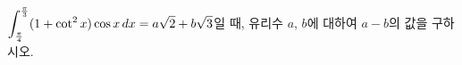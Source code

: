 \hspace*{2mm}\begin{minipage}[t]{\dimexpr\linewidth-2mm\relax}\vspace{0pt}
$\displaystyle\int_{\frac{\pi}{4}}^{\frac{\pi}{3}}(1+\cot^2 x)\cos x\mkern3mu dx=a\sqrt{2}+b\sqrt{3}$일 때, 유리수 $a$, $b$에 대하여 $a-b$의 값을 구하시오.\end{minipage}
